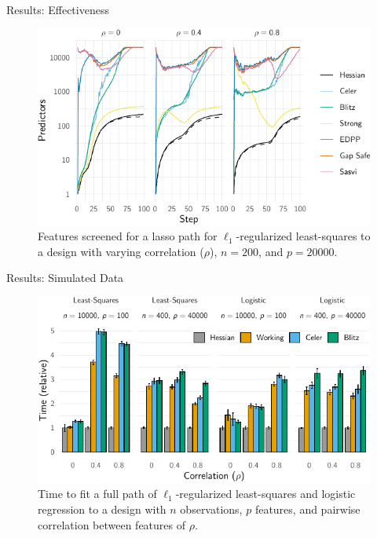 \documentclass[10pt]{beamer}
\begin{document}
\begin{frame}{Results: Effectiveness}
  \begin{figure}
    \centering
    \includegraphics[width=\textwidth]{figures/paper3-simulateddata-efficiency}
    \caption{%
      Features screened for a lasso path for \(\ell_1\)-regularized
      least-squares to a design with varying correlation (\(\rho\)), \(n = 200\), and \(p =
      20000\).
    }
  \end{figure}
\end{frame}

\begin{frame}{Results: Simulated Data}
  \begin{figure}
    \centering
    \includegraphics{figures/paper3-simulateddata-timings}
    \caption{
      Time to fit a full path of \(\ell_1\)-regularized least-squares and
      logistic regression to a design with \(n\) observations, \(p\) features, and pairwise
      correlation between features of \(\rho\).
    }
  \end{figure}
\end{frame}
\end{document}
